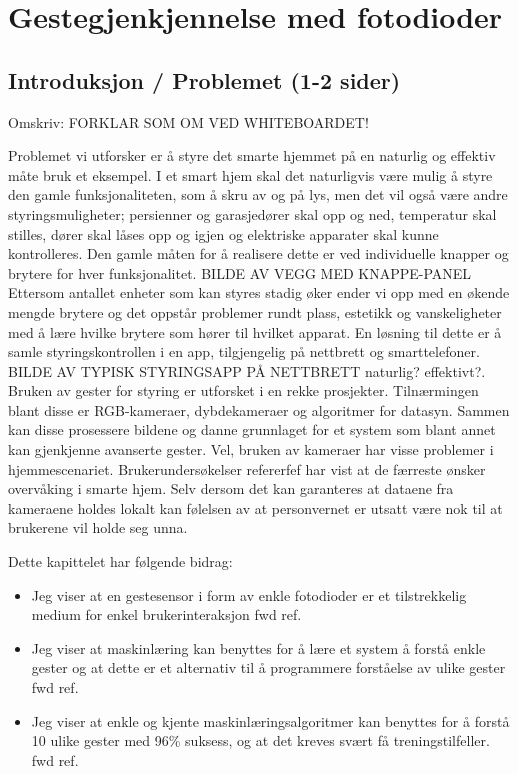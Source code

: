 \section{Gestegjenkjennelse med fotodioder}
\subsection{Introduksjon / Problemet (1-2 sider)}
{\color{red} Omskriv: FORKLAR SOM OM VED WHITEBOARDET!}

Problemet vi utforsker er å styre det smarte hjemmet på en naturlig og effektiv måte {\color{red} bruk et eksempel}. I et smart hjem skal det naturligvis være mulig å styre den gamle funksjonaliteten, som å skru av og på lys, men det vil også være andre styringsmuligheter; persienner og garasjedører skal opp og ned, temperatur skal stilles, dører skal låses opp og igjen og elektriske apparater skal kunne kontrolleres. Den gamle måten for å realisere dette er ved individuelle knapper og brytere for hver funksjonalitet.  {\color{red} BILDE AV VEGG MED KNAPPE-PANEL} Ettersom antallet enheter som kan styres stadig øker ender vi opp med en økende mengde brytere og det oppstår problemer rundt plass, estetikk og vanskeligheter med å lære hvilke brytere som hører til hvilket apparat. En løsning til dette er å samle styringskontrollen i en app, tilgjengelig på nettbrett og smarttelefoner. {\color{red} BILDE AV TYPISK STYRINGSAPP PÅ NETTBRETT} {\color{red} naturlig? effektivt?}. Bruken av gester for styring er utforsket i en rekke prosjekter. Tilnærmingen blant disse er RGB-kameraer, dybdekameraer og algoritmer for datasyn. Sammen kan disse prosessere bildene og danne grunnlaget for et system som blant annet kan gjenkjenne avanserte gester. Vel, bruken av kameraer har visse problemer i hjemmescenariet. Brukerundersøkelser {\color{red} refererfef} har vist at de færreste ønsker overvåking i smarte hjem. Selv dersom det kan garanteres at dataene fra kameraene holdes lokalt kan følelsen av at personvernet er utsatt være nok til at brukerene vil holde seg unna.

Dette kapittelet har følgende bidrag:
\begin{itemize}
\item Jeg viser at en gestesensor i form av enkle fotodioder er et tilstrekkelig medium for enkel brukerinteraksjon {\color{red} fwd ref}.
\item Jeg viser at maskinlæring kan benyttes for å lære et system å forstå enkle gester og at dette er et  alternativ til å programmere forståelse av ulike gester {\color{red} fwd ref}.
\item Jeg viser at enkle og kjente maskinlæringsalgoritmer kan benyttes for å forstå 10 ulike gester med 96\% suksess, og at det kreves svært få treningstilfeller. {\color{red} fwd ref}.
\end{itemize}

